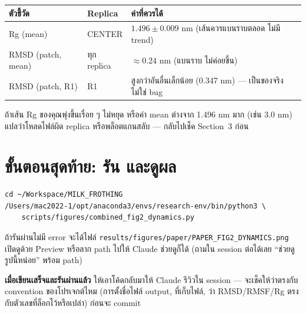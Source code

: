 \documentclass[11pt,a4paper]{article}
\begin{document}
\begin{center}
\begin{tabular}{lll}
\hline
\textbf{ตัวชี้วัด} & \textbf{Replica} & \textbf{ค่าที่ควรได้} \\
\hline
Rg (mean) & CENTER & $1.496 \pm 0.009$ nm (เส้นควรแบนราบตลอด ไม่มี trend) \\
RMSD (patch, mean) & ทุก replica & $\approx 0.24$ nm (แบนราบ ไม่ค่อยขึ้น) \\
RMSD (patch, R1) & R1 & สูงกว่าอันอื่นเล็กน้อย (0.347 nm) — เป็นของจริง ไม่ใช่ bug \\
\hline
\end{tabular}
\end{center}

ถ้าเส้น Rg ของคุณพุ่งขึ้นเรื่อย ๆ ไม่หยุด หรือค่า mean ต่างจาก 1.496 nm มาก
(เช่น 3.0 nm) แปลว่าโหลดไฟล์ผิด replica หรือพล็อตแกนสลับ — กลับไปเช็ค Section~3 ก่อน

\section{ขั้นตอนสุดท้าย: รัน และดูผล}
\begin{lstlisting}
cd ~/Workspace/MILK_FROTHING
/Users/mac2022-1/opt/anaconda3/envs/research-env/bin/python3 \
    scripts/figures/combined_fig2_dynamics.py
\end{lstlisting}

ถ้ารันผ่านไม่มี error จะได้ไฟล์ \texttt{results/figures/paper/PAPER\_FIG2\_DYNAMICS.png}
เปิดดูด้วย Preview หรือลาก path ไปให้ Claude ช่วยดูก็ได้ (ถามใน session ต่อได้เลย
``ช่วยดูรูปนี้หน่อย'' พร้อม path)

\vspace{1em}
\noindent\textbf{เมื่อเขียนเสร็จและรันผ่านแล้ว} ให้เอาโค้ดกลับมาให้ Claude รีวิวใน session
— จะเช็คให้ว่าตรงกับ convention ของโปรเจกต์ไหม (การตั้งชื่อไฟล์ output, ที่เก็บไฟล์,
ว่า RMSD/RMSF/Rg ตรงกับตัวเลขที่ล็อกไว้หรือเปล่า) ก่อนจะ commit
\end{document}
